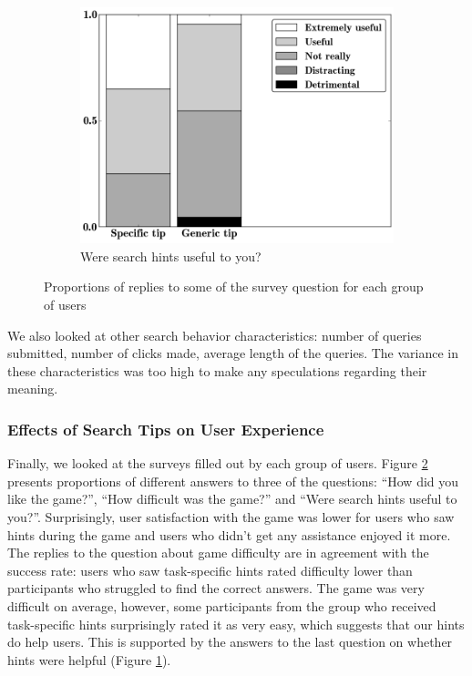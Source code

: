 \begin{figure}[h]
\begin{subfigure}[t]{0.32\textwidth}
	\includegraphics[scale=0.26]{img/useful}
	\caption{Were search hints useful to you?}
    \label{figure:survey:useful}
\end{subfigure}
\caption{Proportions of replies to some of the survey question for each group of users}
\label{figure:hints:survey}
\end{figure}

We also looked at other search behavior characteristics: number of queries submitted, number of clicks made, average length of the queries. The variance in these characteristics was too high to make any speculations regarding their meaning.

\subsubsection{Effects of Search Tips on User Experience}

Finally, we looked at the surveys filled out by each group of users.
Figure \ref{figure:hints:survey} presents proportions of different answers to three of the questions: ``How did you like the game?'', ``How difficult was the game?'' and ``Were search hints useful to you?''.
Surprisingly, user satisfaction with the game was lower for users who saw hints during the game and users who didn't get any assistance enjoyed it more.
The replies to the question about game difficulty are in agreement with the success rate: users who saw task-specific hints rated difficulty lower than participants who struggled to find the correct answers.
The game was very difficult on average, however, some participants from the group who received task-specific hints surprisingly rated it as very easy, which suggests that our hints do help users.
This is supported by the answers to the last question on whether hints were helpful (Figure \ref{figure:survey:useful}).

